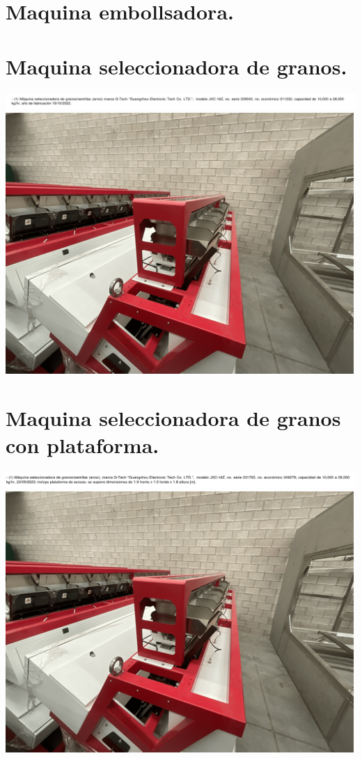 \documentclass{article}
\begin{document}

\section{Maquina embollsadora.} %




\section{Maquina seleccionadora de granos.} %
\includegraphics[width=  \linewidth]{images/decript/5.png}
\includegraphics[width=  .5\linewidth]{images/foto/5.png}


\section{Maquina seleccionadora de granos con plataforma.} %

\includegraphics[width=  \linewidth]{images/decript/6.png}
\includegraphics[width=  .5\linewidth]{images/foto/6.png}


\end{document}
